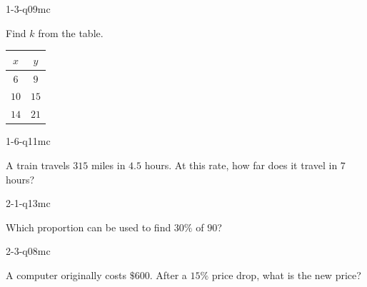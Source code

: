 
\begin{practiceQuestion}{1-3-q09}{mc}
\begin{questionText}
Find $k$ from the table.

\begin{center}
\begin{tabular}{|c|c|}
\hline $x$ & $y$ \\ \hline $6$ & $9$ \\ $10$ & $15$ \\ $14$ & $21$ \\ \hline
\end{tabular}
\end{center}
\end{questionText}
\end{practiceQuestion}

\begin{practiceQuestion}{1-6-q11}{mc}
\begin{questionText}
A train travels $315$ miles in $4.5$ hours. At this rate, how far does it travel in $7$ hours?
\end{questionText}
\end{practiceQuestion}

\begin{practiceQuestion}{2-1-q13}{mc}
\begin{questionText}
Which proportion can be used to find $30\%$ of $90$?
\end{questionText}
\end{practiceQuestion}

\begin{practiceQuestion}{2-3-q08}{mc}
\begin{questionText}
A computer originally costs $\$600$. After a $15\%$ price drop, what is the new price?
\end{questionText}
\end{practiceQuestion}

